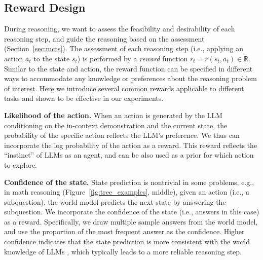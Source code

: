 


\subsection{Reward Design} \label{sec:reward}

During reasoning, we want to assess the feasibility and desirability of each reasoning step, and guide the reasoning based on the assessment (Section~\ref{sec:mcts}).
The assessment of each reasoning step (i.e., applying an action $a_t$ to the state $s_{t}$) is performed by a \emph{reward} function $r_t = r(s_t, a_t) \in \mathbb R$. Similar to the state and action, the reward function can be specified in different ways to accommodate any knowledge or preferences about the reasoning problem of interest. Here we introduce several common rewards applicable to different tasks and shown to be effective in our experiments.

\noindent \textbf{Likelihood of the action.}
When an action is generated by the LLM conditioning on the in-context demonstration and the current state, the probability of the specific action reflects the LLM's preference. We thus can incorporate the log probability of the action as a reward. This reward reflects the ``instinct'' of LLMs as an agent, and can be also used as a prior for which action to explore.

\noindent \textbf{Confidence of the state.}
State prediction is nontrivial in some problems, e.g., in math reasoning (Figure~\ref{fig:tree_examples}, middle), given an action (i.e., a subquestion), the world model predicts the next state by answering the subquestion. We incorporate the confidence of the state (i.e., answers in this case) as a reward. Specifically, we draw multiple sample answers from the world model, and use the proportion of the most frequent answer as the confidence. Higher confidence indicates that the state prediction is more consistent with the world knowledge of LLMs \cite{hao2023bertnet}, which typically leads to a more reliable reasoning step.


